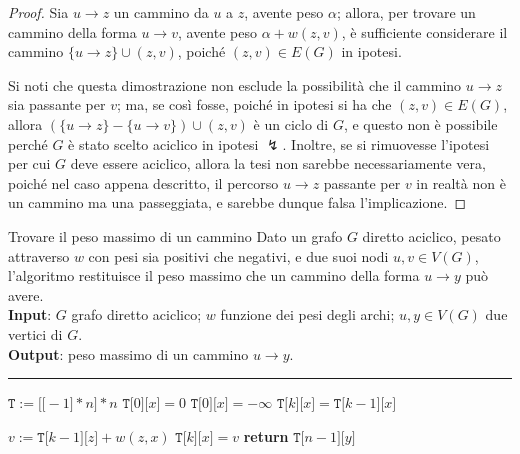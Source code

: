 \documentclass[a4paper, 12pt]{report}
\begin{document}
    \begin{proof}
        Sia $u \rightarrow z$ un cammino da $u$ a $z$, avente peso $\alpha$; allora, per trovare un cammino della forma $u \rightarrow v$, avente peso $\alpha + w(z, v)$, è sufficiente considerare il cammino $\{u \rightarrow z\} \cup (z, v)$, poiché $(z, v) \in E(G)$ in ipotesi.

        Si noti che questa dimostrazione non esclude la possibilità che il cammino $u \rightarrow z$ sia passante per $v$; ma, se così fosse, poiché in ipotesi si ha che $(z, v) \in E(G)$, allora $(\{u \rightarrow z\} - \{u \rightarrow v\}) \cup (z, v)$ è un ciclo di $G$, e questo non è possibile perché $G$ è stato scelto aciclico in ipotesi $\lightning$. Inoltre, se si rimuovesse l'ipotesi per cui $G$ deve essere aciclico, allora la tesi non sarebbe necessariamente vera, poiché nel caso appena descritto, il percorso $u \rightarrow z$ passante per $v$ in realtà non è un cammino ma una passeggiata, e sarebbe dunque falsa l'implicazione.
    \end{proof}

    \begin{framedalgo}[label={maxWeightPaths}, breakable]{Trovare il peso massimo di un cammino}
        Dato un grafo $G$ diretto aciclico, pesato attraverso $w$ con pesi sia positivi che negativi, e due suoi nodi $u, v \in V(G)$, l'algoritmo restituisce il peso massimo che un cammino della forma $u \rightarrow y$ può avere.\\
        \textbf{Input}: $G$ grafo diretto aciclico; $w$ funzione dei pesi degli archi; $u, y \in V(G)$ due vertici di $G$.\\
        \textbf{Output}: peso massimo di un cammino $u \rightarrow y$.

        \hrule
        \begin{algorithmic}[1]
                \State $\texttt{T} := \texttt{[[}-1\texttt{]} * n \texttt{]} * n$
                        \State $\texttt{T[}0\texttt{][}x\texttt{]} = 0$
                    \Else
                        \State $\texttt{T[}0\texttt{][}x\texttt{]} = - \infty$
                    \EndIf
                \EndFor
                        \State $\texttt{T[}k\texttt{][}x\texttt{]} = \texttt{T[}k -1 \texttt{][}x\texttt{]}$ 

                         
                            \State $v := \texttt{T[}k-1\texttt{][}z\texttt{]} + w(z, x)$
                                \State $\texttt{T[}k\texttt{][}x\texttt{]} = v$
                            \EndIf
                        \EndFor
                    \EndFor
                \EndFor
                \State \textbf{return} $\texttt{T[}n- 1\texttt{][}y\texttt{]}$
            \EndFunction
        \end{algorithmic}
    \end{framedalgo}
\end{document}
